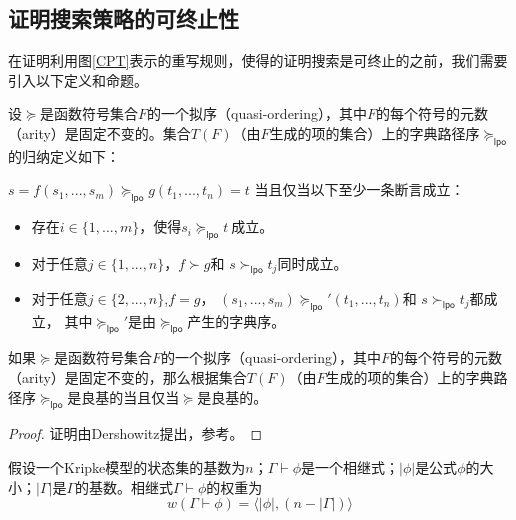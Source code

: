 \subsection{证明搜索策略的可终止性}
在证明利用图\ref{CPT}表示的重写规则，使得\sctlprov{}的证明搜索是可终止的之前，我们需要引入以下定义和命题。

\begin{definition}
	设$\succeq$是函数符号集合$F$的一个拟序（quasi-ordering），其中$F$的每个符号的元数（arity）是固定不变的。集合$T(F)$（由$F$生成的项的集合）上的字典路径序$\succeq_{\mathsf{lpo}}$的归纳定义如下：
	
	$s=f(s_1,...,s_m)\succeq_{\mathsf{lpo}}g(t_1,...,t_n)=t$ 
	当且仅当以下至少一条断言成立：
	\begin{itemize}
		\item 存在$i\in\{1,...,m\}$，使得$s_i\succeq_{\mathsf{lpo}} t~$成立。
		\item 对于任意$j\in\{1,...,n\}$，$f\succ g$和 $s\succ_{\mathsf{lpo}} t_j$同时成立。
		\item 对于任意$j\in\{2,...,n\}$,$f=g$， $(s_1,...,s_m)\succeq_{\mathsf{lpo}}'(t_1,..., t_n)$和 $s\succ_{\mathsf{lpo}}t_j$都成立，
		其中$\succeq_{\mathsf{lpo}}'$是由$\succeq_{\mathsf{lpo}}$产生的字典序。
	\end{itemize}
\end{definition}

\begin{proposition}
	[字典路径序的良基性]\label{termination:well-foundness}
	如果$\succeq$是函数符号集合$F$的一个拟序（quasi-ordering），其中$F$的每个符号的元数（arity）是固定不变的，那么根据集合$T(F)$（由$F$生成的项的集合）上的字典路径序$\succeq_{\mathsf{lpo}}$是良基的当且仅当$\succeq$是良基的。
\end{proposition}
\begin{proof}
	证明由Dershowitz提出，参考\cite{Dershowitz87}。
\end{proof}

\begin{definition}[相继式的权重]\label{sequent:weight}
	假设一个Kripke模型的状态集的基数为$n$；$\Gamma\vdash\phi$是一个\sctlm{}相继式；$|\phi|$是公式$\phi$的大小；$|\Gamma|$是$\Gamma$的基数。相继式$\Gamma\vdash\phi$的权重为$$w(\Gamma\vdash \phi) = \langle|\phi|, (n - |\Gamma|)\rangle$$
\end{definition}

